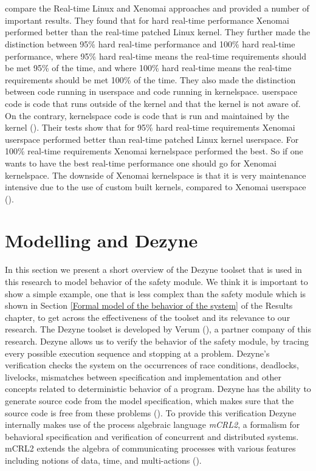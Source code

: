 \documentclass[12pt]{scrreprt}
\begin{document}
\\\\
\citeauthor{brown_martin} compare the Real-time Linux and Xenomai approaches and provided a number of important results. They found that for hard real-time performance Xenomai performed better than the real-time patched Linux kernel. They further made the distinction between 95\% hard real-time performance and 100\% hard real-time performance, where 95\% hard real-time means the real-time requirements should be met 95\% of the time, and where 100\% hard real-time means the real-time requirements should be met 100\% of the time. They also made the distinction between code running in userspace and code running in kernelspace. userspace code is code that runs outside of the kernel and that the kernel is not aware of. On the contrary, kernelspace code is code that is run and maintained by the kernel (\cite{blocking}). Their tests show that for 95\% hard real-time requirements Xenomai userspace performed better than real-time patched Linux kernel userspace. For 100\% real-time requirements Xenomai kernelspace performed the best. So if one wants to have the best real-time performance one should go for Xenomai kernelspace. The downside of Xenomai kernelspace is that it is very maintenance intensive due to the use of custom built kernels, compared to Xenomai userspace (\cite{brown_martin}).

\section{Modelling and Dezyne}
\label{Modelling and Dezyne}
In this section we present a short overview of the Dezyne toolset that is used in this research to model behavior of the safety module. We think it is important to show a simple example, one that is less complex than the safety module which is shown in Section \ref{Formal model of the behavior of the system} of the Results chapter, to get across the effectiveness of the toolset and its relevance to our research. The Dezyne toolset is developed by Verum (\cite{verum}), a partner company of this research. Dezyne allows us to verify the behavior of the safety module, by tracing every possible execution sequence and stopping at a problem. Dezyne's verification checks the system on the occurrences of race conditions, deadlocks, livelocks, mismatches between specification and implementation and other concepts related to deterministic behavior of a program. Dezyne has the ability to generate source code from the model specification, which makes sure that the source code is free from these problems (\cite{dzntut}).
To provide this verification Dezyne internally makes use of the process algebraic language \textit{mCRL2}, a formalism for behavioral specification and verification of concurrent and distributed systems. mCRL2 extends the algebra of communicating processes with various features including notions of data, time, and multi-actions (\cite{mcrl2}).
\end{document}
